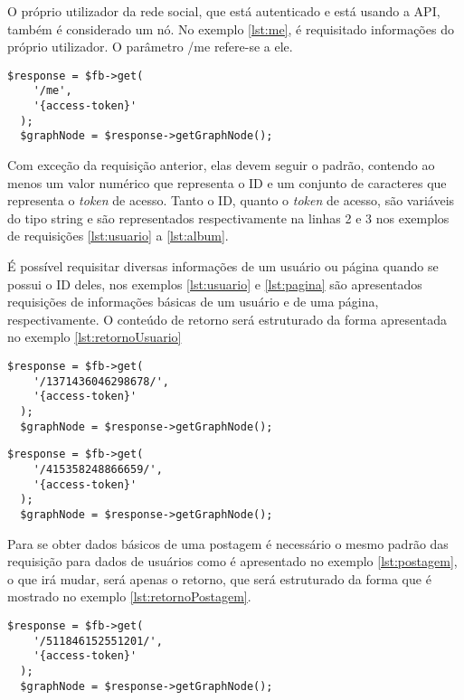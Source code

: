 O próprio utilizador da rede social, que está autenticado e está usando a API, também é considerado um nó. No exemplo \ref{lst:me}, é requisitado informações do próprio utilizador. O parâmetro /me refere-se a ele.

\begin{lstlisting}[caption={Requisitar informações do próprio usuário},label={lst:me}]
  $response = $fb->get(
    '/me',
    '{access-token}'
  );
  $graphNode = $response->getGraphNode();
\end{lstlisting}

Com exceção da requisição anterior, elas devem seguir o padrão, contendo ao menos um valor numérico que representa o ID e um conjunto de caracteres que representa o \textit{token} de acesso. Tanto o ID, quanto o \textit{token} de acesso, são variáveis do tipo string e são representados respectivamente na linhas 2 e 3 nos exemplos de requisições \ref{lst:usuario} a \ref{lst:album}.

É possível requisitar diversas informações de um usuário ou página quando se possui o ID deles, nos exemplos \ref{lst:usuario} e \ref{lst:pagina} são apresentados requisições de informações básicas de um usuário e de uma página, respectivamente. O conteúdo de retorno será estruturado da forma apresentada no exemplo \ref{lst:retornoUsuario}  

\begin{lstlisting}[caption={Requisitar informações de um usuário específico},label={lst:usuario}]
  $response = $fb->get(
    '/1371436046298678/',
    '{access-token}'
  );
  $graphNode = $response->getGraphNode();
\end{lstlisting}

\begin{lstlisting}[caption={Requisitar informações de uma página},label={lst:pagina}]
  $response = $fb->get(
    '/415358248866659/',
    '{access-token}'
  );
  $graphNode = $response->getGraphNode();
\end{lstlisting}

Para se obter dados básicos de uma postagem é necessário o mesmo padrão das requisição para dados de usuários como é apresentado no exemplo \ref{lst:postagem}, o que irá mudar, será apenas o retorno, que será estruturado da forma que é mostrado no exemplo \ref{lst:retornoPostagem}.

\begin{lstlisting}[caption={Requisitar informações de uma postagem específica},label={lst:postagem}]
  $response = $fb->get(
    '/511846152551201/',
    '{access-token}'
  );
  $graphNode = $response->getGraphNode();
\end{lstlisting}

